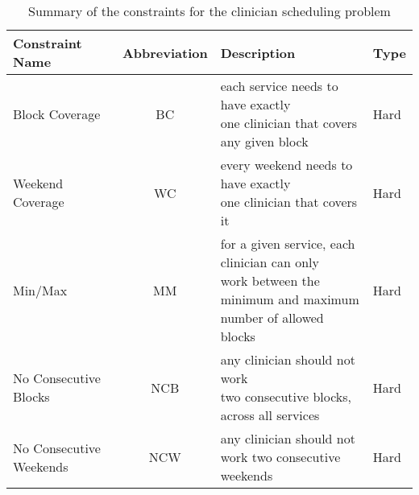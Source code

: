 \begin{table}[h]
	\centering
	\caption{Summary of the constraints for the clinician scheduling problem}%
  \label{tbl:constraint-summary}
	\begin{tabular}{ l c l l }
		\toprule
		\textbf{Constraint Name} & \textbf{Abbreviation} & \textbf{Description}                                                                                                                 & \textbf{Type} \\ \midrule
		Block Coverage                                                                  & BC                    & \makecell[l]{each service needs to have
			exactly \\ one clinician that covers any given block}                                     & Hard          \\ \hline
		Weekend Coverage                                                                & WC                    & \makecell[l]{every weekend needs to have
			exactly \\ one clinician that covers it}                                                 & Hard          \\ \hline
		Min/Max                                                                         & MM                    & \makecell[l]{for a given service, each
			clinician can only \\ work between the minimum and maximum \\ number of allowed
			blocks} & Hard          \\ \hline
		No Consecutive Blocks                                                           & NCB                   & \makecell[l]{any clinician should not work \\
			two consecutive blocks, across all services}                                        & Hard          \\ \hline
		No Consecutive Weekends                                                         & NCW                   & \makecell[l]{any clinician should not work two
			consecutive \\ weekends}                                                           & Hard          \\ \hline

\end{tabular}
\end{table}
